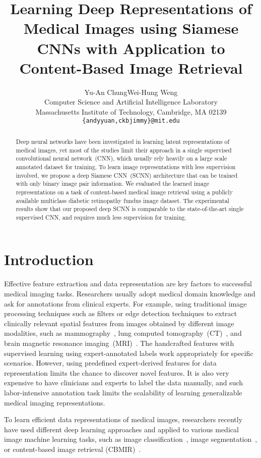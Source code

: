 \documentclass{article}
\title{Learning Deep Representations of Medical Images using Siamese CNNs with Application to Content-Based Image Retrieval}
\author{
  Yu-An Chung\quad Wei-Hung Weng\\
  Computer Science and Artificial Intelligence Laboratory\\
  Massachusetts Institute of Technology, Cambridge, MA 02139\\
  \texttt{\{andyyuan,ckbjimmy\}@mit.edu}\\
}
\begin{document}
\maketitle


\begin{abstract}
Deep neural networks have been investigated in learning latent representations of medical images, yet most of the studies limit their approach in a single supervised convolutional neural network~(CNN), which usually rely heavily on a large scale annotated dataset for training.
To learn image representations with less supervision involved, we propose a deep Siamese CNN~(SCNN) architecture that can be trained with only binary image pair information.
We evaluated the learned image representations on a task of content-based medical image retrieval using a publicly available multiclass diabetic retinopathy fundus image dataset.
The experimental results show that our proposed deep SCNN is comparable to the state-of-the-art single supervised CNN, and requires much less supervision for training.
\end{abstract}

\section{Introduction}
Effective feature extraction and data representation are key factors to successful medical imaging tasks.
Researchers usually adopt medical domain knowledge and ask for annotations from clinical experts.
For example, using traditional image processing techniques such as filters or edge detection techniques to extract clinically relevant spatial features from images obtained by different image modalities, such as mammography~\citep{tsochatzidis2017computer}, lung computed tomography~(CT)~\citep{dhara2017content}, and brain magnetic resonance imaging~(MRI)~\citep{jenitta2017image}.
The handcrafted features with supervised learning using expert-annotated labels work appropriately for specific scenarios.
However, using predefined expert-derived features for data representation limits the chance to discover novel features. 
It is also very expensive to have clinicians and experts to label the data manually, and such labor-intensive annotation task limits the scalability of learning generalizable medical imaging representations.

To learn efficient data representations of medical images, researchers recently have used different deep learning approaches and applied to various medical image machine learning tasks, such as image classification~\citep{esteva2017dermatologist,gulshan2016development}, image segmentation~\citep{havaei2017brain,guo2017deformable}, or content-based image retrieval (CBMIR)~\citep{litjens2017survey,sun2017using,anavi2016visualizing,liu2016generating,shah2016deeply}.
\end{document}
